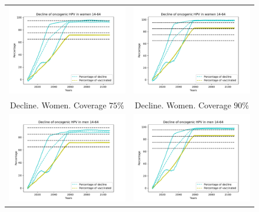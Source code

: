 \begin{figure}[!]
	\centering
	\begin{tabular}{cc}
		\includegraphics[width=0.5\linewidth]{IMGs/9.-Erradicacion_ONCO/onco_muj_75.pdf}	& 
		\includegraphics[width=0.5\linewidth]{IMGs/9.-Erradicacion_ONCO/onco_muj_90.pdf}  \\ 
		Decline. Women. Coverage $75\%$	& Decline. Women. Coverage $90\%$ \\ 
		\includegraphics[width=0.5\linewidth]{IMGs/9.-Erradicacion_ONCO/onco_hom_75.pdf}	& 
		\includegraphics[width=0.5\linewidth]{IMGs/9.-Erradicacion_ONCO/onco_hom_90.pdf}  \\ 

\end{tabular}
\end{figure}

